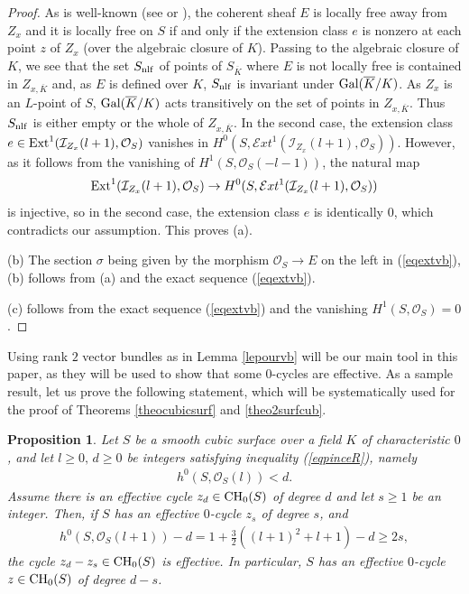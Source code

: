 \documentclass[10pt]{article}
\newtheorem{prop}[theo]{Proposition}
\begin{document}
\begin{proof} As is well-known (see \cite[p. 726]{griffithsharris} or \cite{schwarzenberger}), the coherent sheaf $E$ is locally free  away from $Z_x$ and it is locally free  on $S$ if and only if the extension class $e$ is nonzero at each point $z$ of $Z_x$ (over the algebraic closure of $K$).   Passing to the algebraic closure of $K$, we see that the set $S_{\rm nlf}$ of points of $S_{\overline{K}}$ where $E$ is not locally free is contained in $Z_{x,\overline{K}}$ and, as  $E$ is defined over $K$,  $S_{\rm nlf}$  is invariant under ${\rm Gal}(\overline{K}/K)$. As $Z_x$ is an $L$-point of $S$, ${\rm Gal}(\overline{K}/K)$ acts transitively on the set of points in $Z_{x,\overline{K}}$. Thus $S_{\rm nlf}$ is either empty or the whole of $Z_{x,\overline{K}}$. In the second case,  the extension class $e\in {\rm Ext}^1(\mathcal{I}_{Z_x}(l+1),\mathcal{O}_S)$ vanishes in
$H^0(S,\mathcal{E}xt^1(\mathcal{I}_{Z_x}(l+1),\mathcal{O}_S))$. However, as it follows from the vanishing of $H^1(S,\mathcal{O}_S(-l-1))$, the natural map
$${\rm Ext}^1(\mathcal{I}_{Z_x}(l+1),\mathcal{O}_S)\rightarrow H^0(S,\mathcal{E}xt^1(\mathcal{I}_{Z_x}(l+1),\mathcal{O}_S))$$
is injective, so in the second case, the extension class $e$ is identically $0$, which contradicts our assumption. This proves (a).



(b)  The section $\sigma$ being given by the morphism $\mathcal{O}_S\rightarrow E$ on  the left in (\ref{eqextvb}),  (b) follows  from (a) and the exact sequence (\ref{eqextvb}).

(c) follows from the exact sequence (\ref{eqextvb}) and the vanishing $H^1(S,\mathcal{O}_S)=0$.
\end{proof}
Using rank $2$ vector bundles as in  Lemma \ref{lepourvb} will be our main tool in this paper, as they will be used to show that some $0$-cycles are effective. As a sample result, let us prove   the following statement, which will be systematically used  for  the proof of Theorems \ref{theocubicsurf} and \ref{theo2surfcub}.
\begin{prop}\label{prokeyprop}  Let $S$ be a smooth cubic surface over a field $K$ of characteristic $0$, and let $l\geq 0,\,d\geq 0$ be integers satisfying  inequality (\ref{eqpinceR}), namely
\begin{eqnarray}\label{eqineqpourvbl} h^0(S,\mathcal{O}_S(l))<d.
\end{eqnarray} Assume there is an effective cycle $z_d\in{\rm CH}_0(S)$ of degree $d$ and let $s\geq 1$ be an integer.
Then, if      $S$ has an effective $0$-cycle  $z_s$ of degree $s$, and
\begin{eqnarray}\label{eqnumersect} h^0(S,\mathcal{O}_S(l+1))-d= 1+\frac{3}{2}((l+1)^2+l+1)-d\geq 2s,
\end{eqnarray}
the cycle   $z_d-z_s\in{\rm CH}_0(S)$ is effective. In particular,
$S$ has an effective $0$-cycle $z\in{\rm CH}_0(S)$ of degree $d-s$.

\end{prop}
\end{document}
